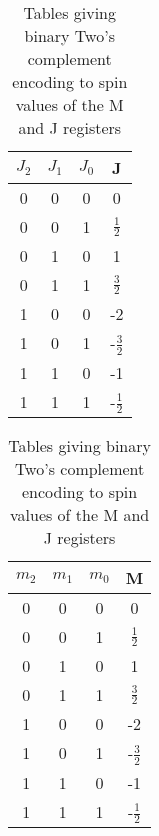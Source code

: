 \begin{table}[H]
\begin{tabular}{ |c c c|c| } 
\hline
 $J_2$ &$J_1$ &$J_0$ &J \\
 \hline
 0 &0 &0 &0 \\ 
 0 &0 &1 &$\frac{1}{2}$ \\ 
 0 &1 &0 &1 \\ 
 0 &1 &1 &$\frac{3}{2}$ \\ 
 \hline 
 1 &0 &0 &-2 \\ 
 1 &0 &1 &-$\frac{3}{2}$ \\ 
 1 &1 &0 &-1 \\ 
 1 &1 &1 &-$\frac{1}{2}$ \\  
 \hline 
\end{tabular}
\quad
\begin{tabular}{ |c c c|c| } 
\hline
 $m_2$ &$m_1$ &$m_0$ &M \\
 \hline
 0 &0 &0 &0 \\ 
 0 &0 &1 &$\frac{1}{2}$ \\ 
 0 &1 &0 &1 \\ 
 0 &1 &1 &$\frac{3}{2}$ \\ 
 \hline 
 1 &0 &0 &-2 \\ 
 1 &0 &1 &-$\frac{3}{2}$ \\ 
 1 &1 &0 &-1 \\ 
 1 &1 &1 &-$\frac{1}{2}$ \\  
 \hline
\end{tabular}
\caption{Tables giving binary Two's complement encoding to spin values of the M and J registers}
\label{fig:encoding}
\end{table}


\newpage

